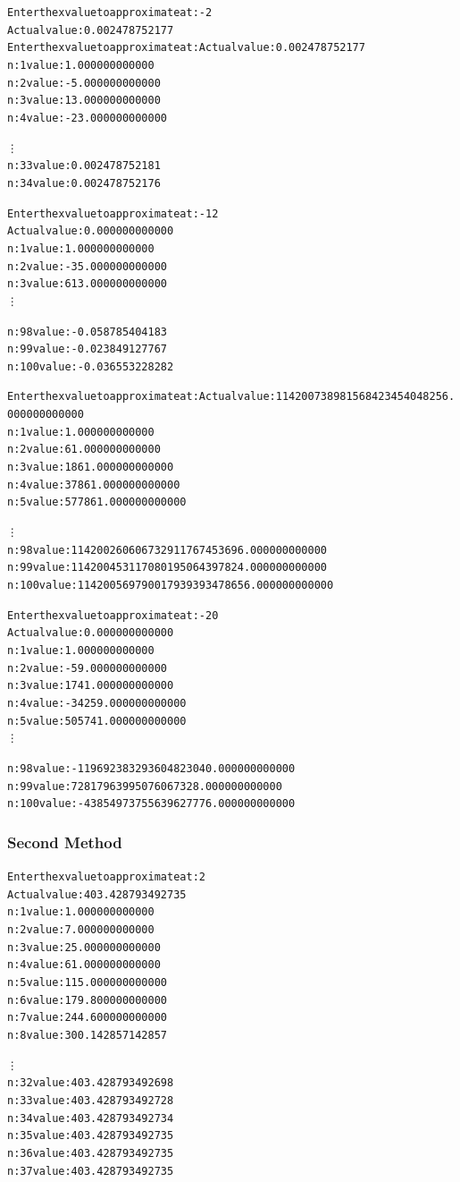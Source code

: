 \documentclass[11pt]{article} %
\begin{document}
\begin{alltt}
Enter the x value to approximate at: -2
Actual value: 0.002478752177 
Enter the x value to approximate at: Actual value: 0.002478752177 
n: 1	value: 1.000000000000
n: 2	value: -5.000000000000
n: 3	value: 13.000000000000
n: 4	value: -23.000000000000

\vdots
n: 33	value: 0.002478752181
n: 34	value: 0.002478752176
\end{alltt}

\begin{alltt}
Enter the x value to approximate at: -12
Actual value: 0.000000000000 
n: 1	value: 1.000000000000
n: 2	value: -35.000000000000
n: 3	value: 613.000000000000
\vdots

n: 98	value: -0.058785404183
n: 99	value: -0.023849127767
n: 100	value: -0.036553228282
\end{alltt}

\begin{alltt}
Enter the x value to approximate at: Actual value: 114200738981568423454048256.000000000000 
n: 1	value: 1.000000000000
n: 2	value: 61.000000000000
n: 3	value: 1861.000000000000
n: 4	value: 37861.000000000000
n: 5	value: 577861.000000000000

\vdots
n: 98	value: 114200260606732911767453696.000000000000
n: 99	value: 114200453117080195064397824.000000000000
n: 100	value: 114200569790017939393478656.000000000000

\end{alltt}

\begin{alltt}
Enter the x value to approximate at: -20
Actual value: 0.000000000000 
n: 1	value: 1.000000000000
n: 2	value: -59.000000000000
n: 3	value: 1741.000000000000
n: 4	value: -34259.000000000000
n: 5	value: 505741.000000000000
\vdots

n: 98	value: -119692383293604823040.000000000000
n: 99	value: 72817963995076067328.000000000000
n: 100	value: -43854973755639627776.000000000000
\end{alltt}


\subsubsection*{Second Method}

\begin{alltt}
Enter the x value to approximate at: 2
Actual value: 403.428793492735 
n: 1	value: 1.000000000000
n: 2	value: 7.000000000000
n: 3	value: 25.000000000000
n: 4	value: 61.000000000000
n: 5	value: 115.000000000000
n: 6	value: 179.800000000000
n: 7	value: 244.600000000000
n: 8	value: 300.142857142857

\vdots
n: 32	value: 403.428793492698
n: 33	value: 403.428793492728
n: 34	value: 403.428793492734
n: 35	value: 403.428793492735
n: 36	value: 403.428793492735
n: 37	value: 403.428793492735
\end{alltt}
\end{document}
